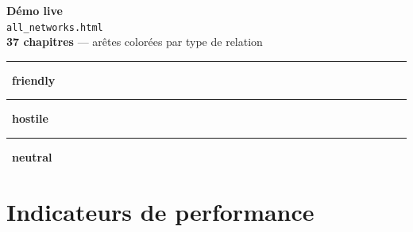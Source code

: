 \documentclass[aspectratio=169]{beamer}
\begin{document}
\begin{frame}[plain]
  \vfill
  \centering
  \Huge\textcolor{mainblue}{\textbf{Démo live}}\\[12pt]
  \large\texttt{all\_networks.html}\\[8pt]
  \normalsize
  \textbf{37 chapitres} --- arêtes colorées par type de relation\\[4pt]
  \textcolor{friendly}{\rule{10pt}{10pt}}~\textbf{friendly} \qquad
  \textcolor{hostile}{\rule{10pt}{10pt}}~\textbf{hostile} \qquad
  \textcolor{neutral}{\rule{10pt}{10pt}}~\textbf{neutral}
  \vfill
\end{frame}

\section{Indicateurs de performance}
\end{document}
